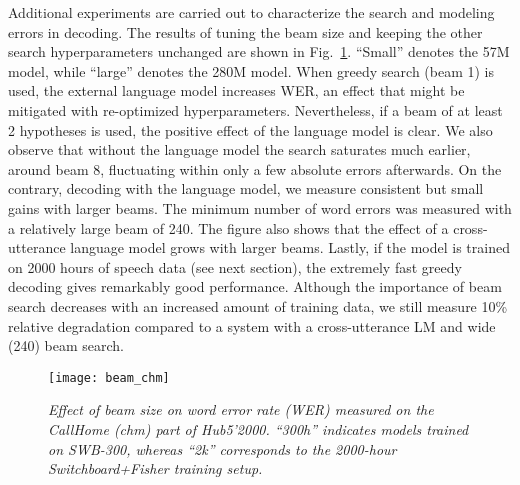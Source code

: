\documentclass[a4paper]{article}
\begin{document}
Additional experiments are carried out to characterize the search and modeling errors in decoding. The results of tuning the beam size and keeping the other search hyperparameters unchanged are shown in Fig.~\ref{fig:beamchm}.
``Small'' denotes the 57M model, while ``large'' denotes the 280M model.
When greedy search (beam 1) is used, the external language model increases WER, an effect that might be mitigated with re-optimized hyperparameters.
Nevertheless, if a beam of at least 2 hypotheses is used, the positive effect of the language model is clear.
We also observe that without the language model the search saturates much earlier, around beam 8, fluctuating within only a few absolute errors afterwards.
On the contrary, decoding with the language model, we measure consistent but small gains with larger beams.
The minimum number of word errors was measured with a relatively large beam of 240.
The figure also shows that the effect of a cross-utterance language model grows with larger beams.
Lastly, if the model is trained on 2000 hours of speech data (see next section), the extremely fast greedy decoding gives remarkably good performance.
Although the importance of beam search decreases with an increased amount of training data, we still measure 10\% relative degradation compared to a system with a cross-utterance LM and wide (240) beam search.



\begin{figure}
\vspace{-1mm}
\centering
\hspace{-1mm}\texttt{[image: beam\_chm]}
\vspace{-4mm}
\caption{{\label{fig:beamchm}
{\it
Effect of beam size on word error rate (WER) measured on the CallHome (chm) part of Hub5'2000. ``300h'' indicates models trained on SWB-300, whereas ``2k'' corresponds to the 2000-hour Switchboard+Fisher training setup.
}}}
\vspace{-2mm}
\end{figure}
\end{document}
